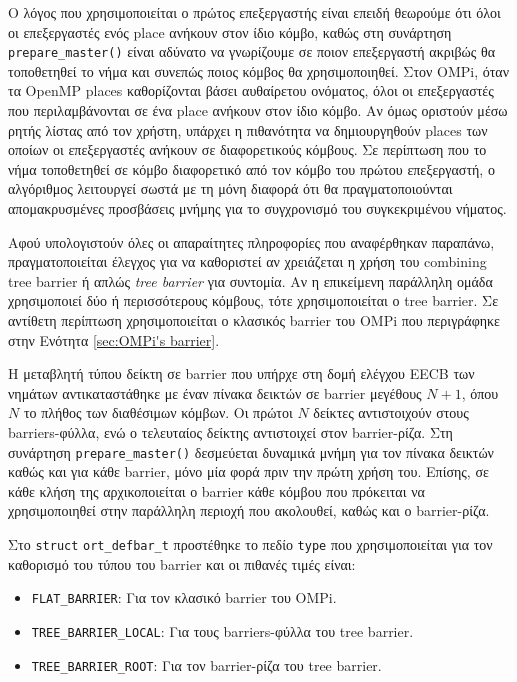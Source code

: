 Ο λόγος που χρησιμοποιείται ο πρώτος επεξεργαστής είναι επειδή θεωρούμε ότι όλοι οι επεξεργαστές ενός place ανήκουν στον ίδιο κόμβο, καθώς στη συνάρτηση \texttt{prepare\_master()} είναι αδύνατο να γνωρίζουμε σε ποιον επεξεργαστή ακριβώς θα τοποθετηθεί το νήμα και συνεπώς ποιος κόμβος θα χρησιμοποιηθεί. Στον OMPi, όταν τα OpenMP places καθορίζονται βάσει αυθαίρετου ονόματος, όλοι οι επεξεργαστές που περιλαμβάνονται σε ένα place ανήκουν στον ίδιο κόμβο. Αν όμως οριστούν μέσω ρητής λίστας από τον χρήστη, υπάρχει η πιθανότητα να δημιουργηθούν places των οποίων οι επεξεργαστές ανήκουν σε διαφορετικούς κόμβους. Σε περίπτωση που το νήμα τοποθετηθεί σε κόμβο διαφορετικό από τον κόμβο του πρώτου επεξεργαστή, ο αλγόριθμος λειτουργεί σωστά με τη μόνη διαφορά ότι θα πραγματοποιούνται απομακρυσμένες προσβάσεις μνήμης για το συγχρονισμό του συγκεκριμένου νήματος.

Αφού υπολογιστούν όλες οι απαραίτητες πληροφορίες που αναφέρθηκαν παραπάνω, πραγματοποιείται έλεγχος για να καθοριστεί αν χρειάζεται η χρήση του combining tree barrier ή απλώς \textit{tree barrier} για συντομία. Αν η επικείμενη παράλληλη ομάδα χρησιμοποιεί δύο ή περισσότερους κόμβους, τότε χρησιμοποιείται ο tree barrier. Σε αντίθετη περίπτωση χρησιμοποιείται ο κλασικός barrier του OMPi που περιγράφηκε στην Ενότητα \ref{sec:OMPi's barrier}.

Η μεταβλητή τύπου δείκτη σε barrier που υπήρχε στη δομή ελέγχου EECB των νημάτων αντικαταστάθηκε με έναν πίνακα δεικτών σε barrier μεγέθους $N+1$, όπου $N$ το πλήθος των διαθέσιμων κόμβων. Οι πρώτοι $N$ δείκτες αντιστοιχούν στους barriers-φύλλα, ενώ ο τελευταίος δείκτης αντιστοιχεί στον barrier-ρίζα. Στη συνάρτηση \texttt{prepare\_master()} δεσμεύεται δυναμικά μνήμη για τον πίνακα δεικτών καθώς και για κάθε barrier, μόνο μία φορά πριν την πρώτη χρήση του. Επίσης, σε κάθε κλήση της αρχικοποιείται ο barrier κάθε κόμβου που πρόκειται να χρησιμοποιηθεί στην παράλληλη περιοχή που ακολουθεί, καθώς και ο barrier-ρίζα.

Στο \texttt{struct} \texttt{ort\_defbar\_t} προστέθηκε το πεδίο \texttt{type} που χρησιμοποιείται για τον καθορισμό του τύπου του barrier και οι πιθανές τιμές είναι:
\begin{itemize}
	\item \texttt{FLAT\_BARRIER}: Για τον κλασικό barrier του OMPi.
	\item \texttt{TREE\_BARRIER\_LOCAL}: Για τους barriers-φύλλα του tree barrier.
	\item \texttt{TREE\_BARRIER\_ROOT}: Για τον barrier-ρίζα του tree barrier.
\end{itemize}

